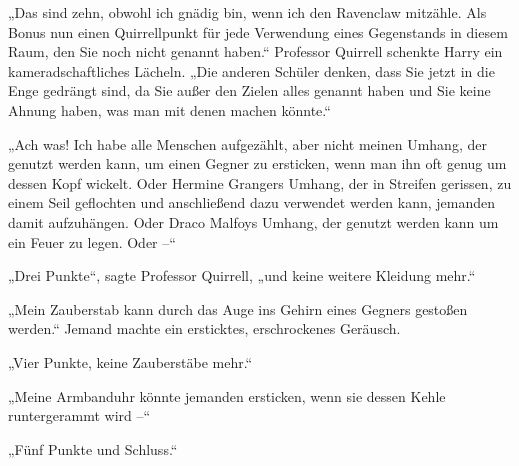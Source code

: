 „Das sind zehn, obwohl ich gnädig bin, wenn ich den Ravenclaw mitzähle. Als Bonus nun einen Quirrellpunkt für jede Verwendung eines Gegenstands in diesem Raum, den Sie noch nicht genannt haben.“ Professor Quirrell schenkte Harry ein kameradschaftliches Lächeln. „Die anderen Schüler denken, dass Sie jetzt in die Enge gedrängt sind, da Sie außer den Zielen alles genannt haben und Sie keine Ahnung haben, was man mit denen machen könnte.“

„Ach was! Ich habe alle Menschen aufgezählt, aber nicht meinen Umhang, der genutzt werden kann, um einen Gegner zu ersticken, wenn man ihn oft genug um dessen Kopf wickelt. Oder Hermine Grangers Umhang, der in Streifen gerissen, zu einem Seil geflochten und anschließend dazu verwendet werden kann, jemanden damit aufzuhängen. Oder Draco Malfoys Umhang, der genutzt werden kann um ein Feuer zu legen. Oder –“

„Drei Punkte“, sagte Professor Quirrell, „und keine weitere Kleidung mehr.“

„Mein Zauberstab kann durch das Auge ins Gehirn eines Gegners gestoßen werden.“ Jemand machte ein ersticktes, erschrockenes Geräusch.

„Vier Punkte, keine Zauberstäbe mehr.“

„Meine Armbanduhr könnte jemanden ersticken, wenn sie dessen Kehle runtergerammt wird –“

„Fünf Punkte und Schluss.“

